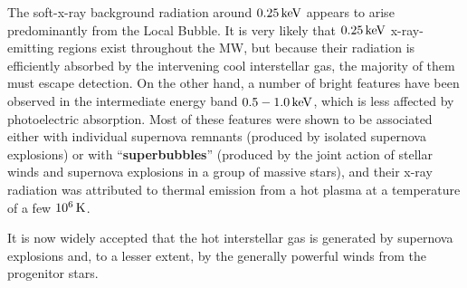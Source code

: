\documentclass[a4paper,10pt]{article}
\begin{document}
{\noindent}The soft-x-ray background radiation around $0.25\,{\rm keV}$ appears to arise predominantly from the Local Bubble. It is very likely that $0.25\,{\rm keV}$ x-ray-emitting regions exist throughout the MW, but because their radiation is efficiently absorbed by the intervening cool interstellar gas, the majority of them must escape detection. On the other hand, a number of bright features have been observed in the intermediate energy band $0.5-1.0\,{\rm keV}$, which is less affected by photoelectric absorption. Most of these features were shown to be associated either with individual supernova remnants (produced by isolated supernova explosions) or with ``\textbf{superbubbles}'' (produced by the joint action of stellar winds and supernova explosions in a group of massive stars), and their x-ray radiation was attributed to thermal emission from a hot plasma at a temperature of a few $10^6\,{\rm K}$.

{\noindent}It is now widely accepted that the hot interstellar gas
is generated by supernova explosions and, to a lesser extent, by the generally powerful winds from the progenitor stars.
\end{document}
